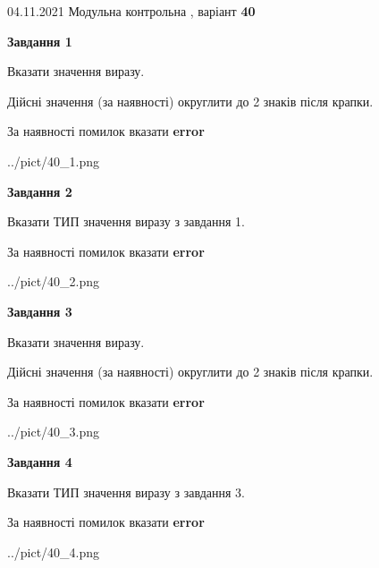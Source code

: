 \documentclass[11pt, ukrainian]{article}
\begin{document}
{04.11.2021 Модульна контрольна , варіант  \No \textbf { 40 }\par}
{
\begin {large}
{\begin {center}\textbf{Завдання 1}\end {center}}\par
Вказати значення виразу. \par
Дійсні значення (за наявності) округлити до 2 знаків після крапки. \par
За наявності помилок вказати \textbf{error}

\begin{center}
	{../pict/40_1.png}
\end{center}
\newpage

{\begin {center}\textbf{Завдання 2}\end {center}}\par
Вказати ТИП значення виразу з завдання 1. \par
За наявності помилок вказати \textbf{error}

\begin{center}
	{../pict/40_2.png}
\end{center}
\newpage

{\begin {center}\textbf{Завдання 3}\end {center}}\par
Вказати значення виразу. \par
Дійсні значення (за наявності) округлити до 2 знаків після крапки. \par
За наявності помилок вказати \textbf{error}

\begin{center}
	{../pict/40_3.png}
\end{center}
\newpage

{\begin {center}\textbf{Завдання 4}\end {center}}\par
Вказати ТИП значення виразу з завдання 3. \par
За наявності помилок вказати \textbf{error}

\begin{center}
	{../pict/40_4.png}
\end{center}
\newpage


\end{large}}
\end{document}
